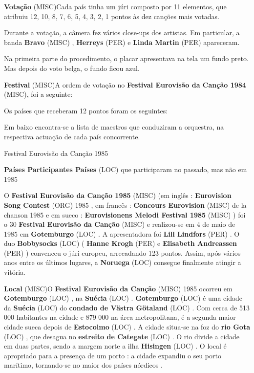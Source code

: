 \documentclass[12pt,a4paper]{article}
\begin{document}
\textbf{Votação} (MISC)Cada país tinha um júri composto por 11 elementos, que atribuiu 12, 10, 8, 7, 6, 5, 4, 3, 2, 1 pontos às dez canções mais votadas.

Durante a votação, a câmera fez vários close-ups dos artistas. Em particular, a banda \textbf{Bravo} (MISC) , \textbf{Herreys} (PER) e \textbf{Linda Martin} (PER) apareceram.

Na primeira parte do procedimento, o placar apresentava na tela um fundo preto. Mas depois do voto belga, o fundo ficou azul.



\textbf{Festival} (MISC)A ordem de votação no \textbf{Festival Eurovisão da Canção 1984} (MISC), foi a seguinte:

Os países que receberam 12 pontos foram os seguintes:

Em baixo encontra-se a lista de maestros que conduziram a orquestra, na respectiva actuação de cada país concorrente.



Festival Eurovisão da Canção 1985



\textbf{Países Participantes Países} (LOC) que participaram no passado, mas não em 1985

O \textbf{Festival Eurovisão da Canção 1985} (MISC) (em inglês : \textbf{Eurovision Song Contest} (ORG) 1985 , em francês : \textbf{Concours Eurovision} (MISC) de la chanson 1985 e em sueco : \textbf{Eurovisionens Melodi Festival 1985} (MISC) ) foi o 30 \textbf{Festival Eurovisão da Canção} (MISC) e realizou-se em 4 de maio de 1985 em \textbf{Gotemburgo} (LOC) . A apresentadora foi \textbf{Lill Lindfors} (PER) . O duo \textbf{Bobbysocks} (LOC) ( \textbf{Hanne Krogh} (PER) e \textbf{Elisabeth Andreassen} (PER) ) convenceu o júri europeu, arrecadando 123 pontos. Assim, após vários anos entre os últimos lugares, a \textbf{Noruega} (LOC) consegue finalmente atingir a vitória.



\textbf{Local} (MISC)O \textbf{Festival Eurovisão da Canção} (MISC) 1985 ocorreu em \textbf{Gotemburgo} (LOC) , na \textbf{Suécia} (LOC) . \textbf{Gotemburgo} (LOC) é uma cidade da \textbf{Suécia} (LOC) do \textbf{condado de Västra Götaland} (LOC) . Com cerca de 513 000 habitantes na cidade e 879 000 na área metropolitana, é a segunda maior cidade sueca depois de \textbf{Estocolmo} (LOC) . A cidade situa-se na foz do \textbf{rio Gota} (LOC) , que desagua no \textbf{estreito de Categate} (LOC) . O rio divide a cidade em duas partes, sendo a margem norte a ilha \textbf{Hisingen} (LOC) . O local é apropriado para a presença de um porto : a cidade expandiu o seu porto marítimo, tornando-se no maior dos países nórdicos .
\end{document}
